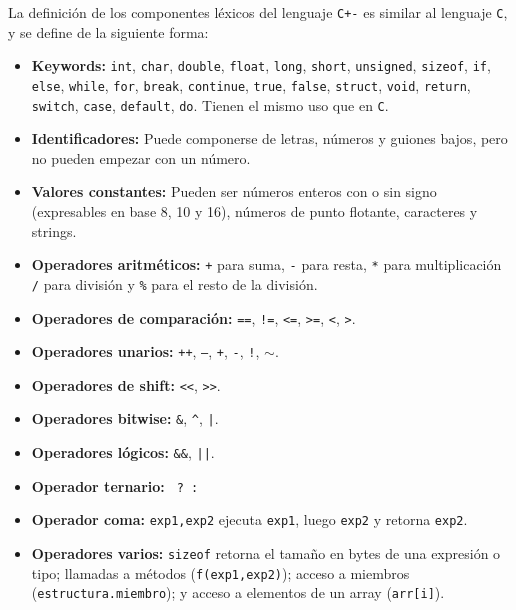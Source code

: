 \documentclass[12pt]{article}
\newcommand{\C}{\texttt{C}}
\begin{document}
La definici\'on de los componentes l\'exicos del lenguaje \texttt{C+-} es similar al lenguaje \C, y se define de la siguiente forma:
\begin{itemize}
    \item \textbf{Keywords:} \texttt{int}, \texttt{char}, \texttt{double}, \texttt{float}, \texttt{long}, \texttt{short}, \texttt{unsigned}, \texttt{sizeof}, \texttt{if}, \texttt{else}, \texttt{while}, \texttt{for}, \texttt{break}, \texttt{continue}, \texttt{true}, \texttt{false}, \texttt{struct}, \texttt{void}, \texttt{return}, \texttt{switch}, \texttt{case}, \texttt{default}, \texttt{do}. Tienen el mismo uso que en \C.
    \item \textbf{Identificadores:} Puede componerse de letras, n\'umeros y guiones bajos, pero no pueden empezar con un n\'umero.
    \item \textbf{Valores constantes:} Pueden ser n\'umeros enteros con o sin signo (expresables en base 8, 10 y 16), n\'umeros de punto flotante, caracteres y strings.
    \item \textbf{Operadores aritm\'eticos:} \texttt{+} para suma, \texttt{-} para resta, \texttt{*} para multiplicaci\'on \texttt{/} para divisi\'on y \texttt{\%} para el resto de la divisi\'on.
    \item \textbf{Operadores de comparaci\'on:} \texttt{==}, \texttt{!=}, \texttt{<=}, \texttt{>=}, \texttt{<}, \texttt{>}.
    \item \textbf{Operadores unarios:} \texttt{++}, \texttt{--}, \texttt{+}, \texttt{-}, \texttt{!}, $\mathtt\sim$.
    \item \textbf{Operadores de shift:} \texttt{<{}<}, \texttt{>{}>}.
    \item \textbf{Operadores bitwise:} \texttt{\&}, \texttt{\^}, \texttt{|}.
    \item \textbf{Operadores l\'ogicos:} \texttt{\&\&}, \texttt{||}.
    \item \textbf{Operador ternario:} \texttt{ ? : }
    \item \textbf{Operador coma:} \texttt{exp1,exp2} ejecuta \texttt{exp1}, luego \texttt{exp2} y retorna \texttt{exp2}.
    \item \textbf{Operadores varios:} \texttt{sizeof} retorna el tama\~no en bytes de una expresi\'on o tipo; llamadas a m\'etodos (\texttt{f(exp1,exp2)}); acceso a miembros (\texttt{estructura.miembro}); y acceso a elementos de un array (\texttt{arr[i]}).
\end{itemize}
\end{document}
